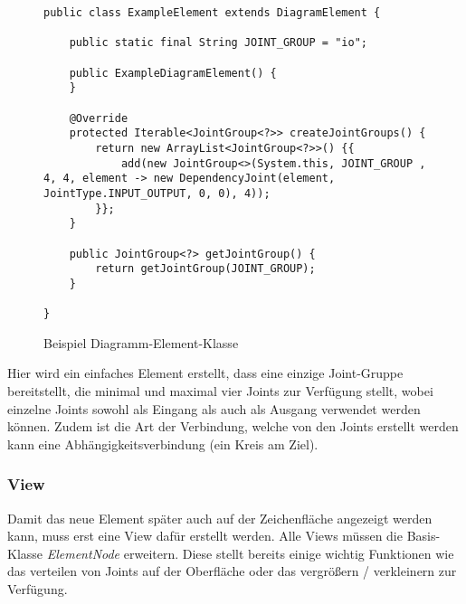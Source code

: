 \begin{figure}[h!]
	\centering
	\begin{lstlisting}
public class ExampleElement extends DiagramElement {

    public static final String JOINT_GROUP = "io";

    public ExampleDiagramElement() {
    }

    @Override
    protected Iterable<JointGroup<?>> createJointGroups() {
        return new ArrayList<JointGroup<?>>() {{
            add(new JointGroup<>(System.this, JOINT_GROUP , 4, 4, element -> new DependencyJoint(element, JointType.INPUT_OUTPUT, 0, 0), 4));
        }};
    }

    public JointGroup<?> getJointGroup() {
        return getJointGroup(JOINT_GROUP);
    }

}
	\end{lstlisting}
	\caption{Beispiel Diagramm-Element-Klasse}
\end{figure}
Hier wird ein einfaches Element erstellt, dass eine einzige Joint-Gruppe bereitstellt, die minimal und maximal
vier Joints zur Verfügung stellt, wobei einzelne Joints sowohl als Eingang als auch als Ausgang verwendet werden
können. Zudem ist die Art der Verbindung, welche von den Joints erstellt werden kann eine Abhängigkeitsverbindung
(ein Kreis am Ziel).
\subsubsection{View}
Damit das neue Element später auch auf der Zeichenfläche angezeigt werden kann, muss erst eine View dafür erstellt
werden. Alle Views müssen die Basis-Klasse \textit{ElementNode} erweitern. Diese stellt bereits einige wichtig
Funktionen wie das verteilen von Joints auf der Oberfläche oder das vergrößern / verkleinern zur Verfügung.

